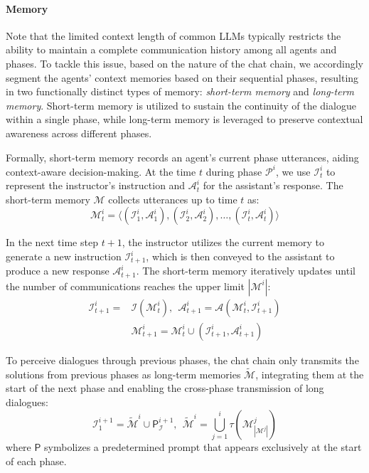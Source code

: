 \documentclass[11pt]{article}
\begin{document}
\paragraph{Memory}
Note that the limited context length of common LLMs typically restricts the ability to maintain a complete communication history among all agents and phases.
To tackle this issue, based on the nature of the chat chain, we accordingly segment the agents' context memories based on their sequential phases, resulting in two functionally distinct types of memory: \textit{short-term memory} and \textit{long-term memory}.
Short-term memory is utilized to sustain the continuity of the dialogue within a single phase, while long-term memory is leveraged to preserve contextual awareness across different phases.

Formally, short-term memory records an agent's current phase utterances, aiding context-aware decision-making.
At the time $t$ during phase $\mathcal{P}^i$, we use $\mathcal{I}_t^i$ to represent the instructor's instruction and $\mathcal{A}_t^i$ for the assistant's response.
The short-term memory $\mathcal{M}$ collects utterances up to time $t$ as:
\begin{equation}
\mathcal{M}_t^i = \langle (\mathcal{I}_1^i,\mathcal{A}_1^i), (\mathcal{I}_2^i,\mathcal{A}_2^i), \ldots, (\mathcal{I}_t^i,\mathcal{A}_t^i) \rangle
\end{equation}

In the next time step $t+1$, the instructor utilizes the current memory to generate a new instruction $\mathcal{I}_{t+1}^i$, which is then conveyed to the assistant to produce a new response $\mathcal{A}_{t+1}^i$. The short-term memory iteratively updates until the number of communications reaches the upper limit $|\mathcal{M}^i|$:
\begin{equation}
\begin{aligned}
\mathcal{I}_{t+1}^i = &\mathcal{I}(\mathcal{M}_t^i), \ \ \mathcal{A}_{t+1}^i = \mathcal{A}(\mathcal{M}_t^i, \mathcal{I}_{t+1}^i) \\
&\mathcal{M}_{t+1}^i = \mathcal{M}_t^i \cup (\mathcal{I}_{t+1}^i, \mathcal{A}_{t+1}^i)
\end{aligned}
\end{equation}

To perceive dialogues through previous phases, the chat chain only transmits the solutions from previous phases as long-term memories $\tilde{\mathcal{M}}$, integrating them at the start of the next phase and enabling the cross-phase transmission of long dialogues:
\begin{equation}
\mathcal{I}_1^{i+1} = \tilde{\mathcal{M}}^{i} \cup \mathsf{P}^{i+1}_{\mathcal{I}}, \ \ \tilde{\mathcal{M}}^{i} = \bigcup_{j=1}^{i} \tau(\mathcal{M}_{|\mathcal{M}^j|}^{j})
\end{equation}
where \(\mathsf{P}\) symbolizes a predetermined prompt that appears exclusively at the start of each phase.
\end{document}
